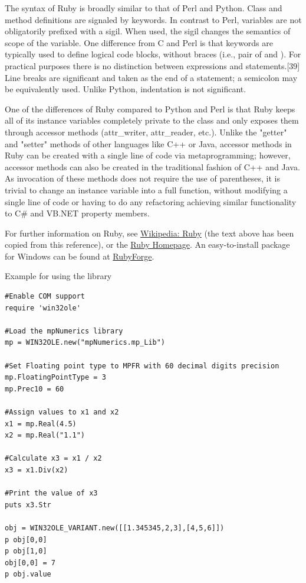 \vpara
The syntax of Ruby is broadly similar to that of Perl and Python. Class and method definitions are signaled by keywords. In contrast to Perl, variables are not obligatorily prefixed with a sigil. When used, the sigil changes the semantics of scope of the variable. One difference from C and Perl is that keywords are typically used to define logical code blocks, without braces (i.e., pair of { and }). For practical purposes there is no distinction between expressions and statements.[39] Line breaks are significant and taken as the end of a statement; a semicolon may be equivalently used. Unlike Python, indentation is not significant.

\vpara
One of the differences of Ruby compared to Python and Perl is that Ruby keeps all of its instance variables completely private to the class and only exposes them through accessor methods (attr\_writer, attr\_reader, etc.). Unlike the "getter" and "setter" methods of other languages like C++ or Java, accessor methods in Ruby can be created with a single line of code via metaprogramming; however, accessor methods can also be created in the traditional fashion of C++ and Java. As invocation of these methods does not require the use of parentheses, it is trivial to change an instance variable into a full function, without modifying a single line of code or having to do any refactoring achieving similar functionality to C\# and VB.NET property members.

\vpara
For further information on Ruby, see \href{http://en.wikipedia.org/wiki/Ruby_(programming_language)}{Wikipedia: Ruby} (the text above has been copied from this reference), or the  \href{http://www.ruby-lang.org/en/}{Ruby Homepage}. An easy-to-install package for Windows can be found at  \href{http://rubyforge.org/projects/rubyinstaller}{RubyForge}.

\vpara
Example for using the library

\begin{lstlisting}
#Enable COM support
require 'win32ole'

#Load the mpNumerics library
mp = WIN32OLE.new("mpNumerics.mp_Lib")

#Set Floating point type to MPFR with 60 decimal digits precision
mp.FloatingPointType = 3
mp.Prec10 = 60

#Assign values to x1 and x2
x1 = mp.Real(4.5)
x2 = mp.Real("1.1")

#Calculate x3 = x1 / x2
x3 = x1.Div(x2)

#Print the value of x3
puts x3.Str

obj = WIN32OLE_VARIANT.new([[1.345345,2,3],[4,5,6]])
p obj[0,0] 
p obj[1,0] 
obj[0,0] = 7
p obj.value
\end{lstlisting}


